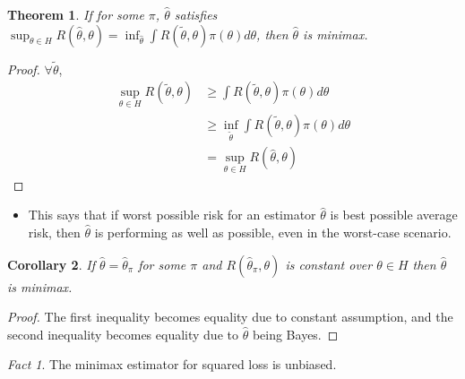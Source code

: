 \documentclass[11pt,reqno]{amsart}
\newtheorem{theorem}{Theorem}
\newtheorem{corollary}[theorem]{Corollary}
\theoremstyle{remark}
\newtheorem{fact}{Fact}
\begin{document}
\begin{theorem}
If for some $\pi$, $\hat\theta$ satisfies $\sup_{\theta\in H}R(\hat\theta,\theta)=\inf_{\hat\theta}\int R(\tilde \theta,\theta)\pi(\theta)d\theta$, 
then $\hat\theta$ is minimax.
\end{theorem}
\begin{proof}
$\forall\tilde\theta$, 
\begin{align*}
\sup_{\theta\in H}R(\tilde\theta,\theta)&\geq\int R(\tilde\theta,\theta)\pi(\theta)d\theta\\
&\geq \inf_{\tilde\theta}\int R(\tilde\theta,\theta)\pi(\theta)d\theta\\
&=\sup_{\theta\in H}R(\hat\theta,\theta)
\end{align*}
\end{proof}
\begin{itemize}
\item This says that if worst possible risk for an estimator $\hat\theta$ is best possible average risk, then $\hat\theta$ is performing as well as possible, even in the worst-case scenario.
\end{itemize}
\begin{corollary}
If $\hat\theta=\hat\theta_\pi$ for some $\pi$ and $R(\hat\theta_\pi,\theta)$ is constant over $\theta\in H$ then $\hat\theta$ is minimax.
\end{corollary}
\begin{proof}
The first inequality becomes equality due to constant assumption, and the second inequality 
becomes equality due to $\hat\theta$ being Bayes.
\end{proof}
\begin{fact}
The minimax estimator for squared loss is unbiased.
\end{fact}
\end{document}
